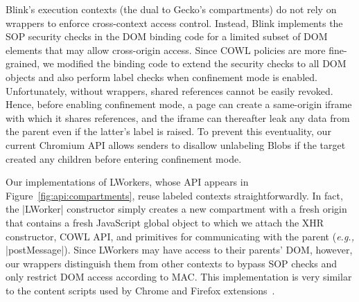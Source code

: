 Blink's execution contexts (the dual to Gecko's compartments) do not
rely on wrappers to enforce cross-context access control.
%
Instead, Blink implements the SOP security checks in the DOM binding
code for a limited subset of DOM elements that may allow cross-origin
access.
%
%
Since COWL policies are more fine-grained, we modified the binding
code to extend the security checks to all DOM objects and also
perform label checks when confinement mode is enabled.
%
Unfortunately, without wrappers, shared references cannot be easily revoked.
%
Hence, before enabling confinement mode, a page can create a
same-origin iframe with which it shares references, and the iframe can
thereafter leak any data from the parent even if the latter's label is
raised.
%
To prevent this eventuality, our current Chromium API allows senders to disallow
unlabeling Blobs if the target created any children before entering
confinement mode.


Our implementations of LWorkers, whose API appears in
Figure~\ref{fig:api:compartments}, reuse labeled contexts
straightforwardly.
%
In fact, the \js|LWorker| constructor simply creates a new
compartment with a fresh origin that contains a fresh JavaScript
global object to which we attach the XHR constructor, COWL API, and
primitives for communicating with the parent (\emph{e.g.,}
\js|postMessage|).
%
Since LWorkers may have access to their parents' DOM, however, our
wrappers distinguish them from other contexts to bypass SOP checks and
only restrict DOM access according to MAC.
%
This implementation is very similar to the content scripts
used by Chrome and Firefox extensions~\cite{Carlini:2012, addon-sdk}.
 
